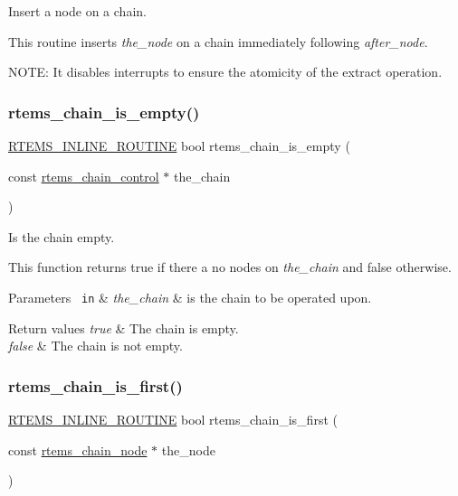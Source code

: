 Insert a node on a chain. 

This routine inserts {\itshape the\+\_\+node} on a chain immediately following {\itshape after\+\_\+node}.

N\+O\+TE\+: It disables interrupts to ensure the atomicity of the extract operation. \mbox{\label{group__ClassicChains_ga82c37408681422fcdf19b0cdf4d96332}} 
\subsubsection{\texorpdfstring{rtems\_chain\_is\_empty()}{rtems\_chain\_is\_empty()}}
{\footnotesize\ttfamily \mbox{\hyperlink{group__RTEMSScoreBaseDefs_gac216239df231d5dbd15e3520b0b9313f}{R\+T\+E\+M\+S\+\_\+\+I\+N\+L\+I\+N\+E\+\_\+\+R\+O\+U\+T\+I\+NE}} bool rtems\+\_\+chain\+\_\+is\+\_\+empty (\begin{DoxyParamCaption}\item[{const \mbox{\hyperlink{unionChain__Control}{rtems\+\_\+chain\+\_\+control}} $\ast$}]{the\+\_\+chain }\end{DoxyParamCaption})}



Is the chain empty. 

This function returns true if there a no nodes on {\itshape the\+\_\+chain} and false otherwise.


\begin{DoxyParams}[1]{Parameters}
\mbox{\texttt{ in}}  & {\em the\+\_\+chain} & is the chain to be operated upon.\\
\hline
\end{DoxyParams}

\begin{DoxyRetVals}{Return values}
{\em true} & The chain is empty. \\
\hline
{\em false} & The chain is not empty. \\
\hline
\end{DoxyRetVals}
\mbox{\label{group__ClassicChains_ga9b9b4751cc9266028c9d8f1844779d6a}} 
\subsubsection{\texorpdfstring{rtems\_chain\_is\_first()}{rtems\_chain\_is\_first()}}
{\footnotesize\ttfamily \mbox{\hyperlink{group__RTEMSScoreBaseDefs_gac216239df231d5dbd15e3520b0b9313f}{R\+T\+E\+M\+S\+\_\+\+I\+N\+L\+I\+N\+E\+\_\+\+R\+O\+U\+T\+I\+NE}} bool rtems\+\_\+chain\+\_\+is\+\_\+first (\begin{DoxyParamCaption}\item[{const \mbox{\hyperlink{structChain__Node__struct}{rtems\+\_\+chain\+\_\+node}} $\ast$}]{the\+\_\+node }\end{DoxyParamCaption})}



